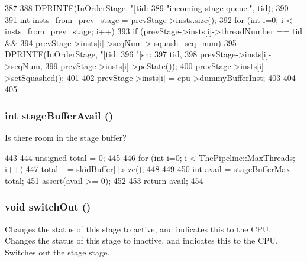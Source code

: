 \begin{DoxyCode}
387 {
388     DPRINTF(InOrderStage, "[tid:%
389             "incoming stage queue.\n", tid);
390 
391     int insts_from_prev_stage = prevStage->insts.size();
392     for (int i=0; i < insts_from_prev_stage; i++) {
393         if (prevStage->insts[i]->threadNumber == tid &&
394             prevStage->insts[i]->seqNum > squash_seq_num) {
395             DPRINTF(InOrderStage, "[tid:%
396                     "[sn:%
397                     tid,
398                     prevStage->insts[i]->seqNum,
399                     prevStage->insts[i]->pcState());
400             prevStage->insts[i]->setSquashed();
401 
402             prevStage->insts[i] = cpu->dummyBufferInst;
403         }
404     }
405 }
\end{DoxyCode}
\hypertarget{classPipelineStage_a4623e7080104807616729bb5504b76ce}{
\subsubsection[{stageBufferAvail}]{\setlength{\rightskip}{0pt plus 5cm}int stageBufferAvail ()}}
\label{classPipelineStage_a4623e7080104807616729bb5504b76ce}
Is there room in the stage buffer? 


\begin{DoxyCode}
443 {
444     unsigned total = 0;
445 
446     for (int i=0; i < ThePipeline::MaxThreads; i++) {
447         total += skidBuffer[i].size();
448     }
449 
450     int avail = stageBufferMax - total;
451     assert(avail >= 0);
452 
453     return avail;
454 }
\end{DoxyCode}
\hypertarget{classPipelineStage_a05f299b443f8cc73a93d61572edc0218}{
\subsubsection[{switchOut}]{\setlength{\rightskip}{0pt plus 5cm}void switchOut ()}}
\label{classPipelineStage_a05f299b443f8cc73a93d61572edc0218}
Changes the status of this stage to active, and indicates this to the CPU. Changes the status of this stage to inactive, and indicates this to the CPU. Switches out the stage stage. 


